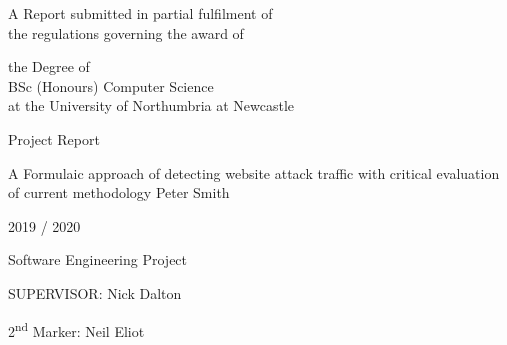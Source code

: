 
\begin{titlepage}
\Large
A Report submitted in partial fulfilment of\\
 the regulations governing the award of
\par
the Degree of\\[5mm]
{\huge	 BSc (Honours) Computer Science }\\[5mm]
at the University of Northumbria at Newcastle
\par
\vspace*{1in}
{\Large Project Report}
\par\vspace{1em}
{\Huge A Formulaic approach of detecting website attack traffic with critical evaluation of current methodology}
\vfill
Peter Smith
\par\vspace{1em}
2019 / 2020
\par\vspace{1em}
Software Engineering Project
\par\vspace{1em}
SUPERVISOR: Nick Dalton
\par
2\textsuperscript{\small nd} Marker: Neil Eliot
\end{titlepage}
